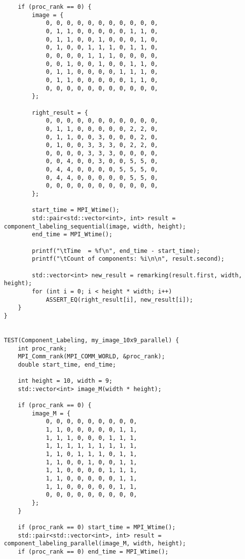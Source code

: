 \documentclass{report}
\begin{document}
\begin{lstlisting}
    if (proc_rank == 0) {
        image = {
            0, 0, 0, 0, 0, 0, 0, 0, 0, 0, 0,
            0, 1, 1, 0, 0, 0, 0, 0, 1, 1, 0,
            0, 1, 1, 0, 0, 1, 0, 0, 0, 1, 0,
            0, 1, 0, 0, 1, 1, 1, 0, 1, 1, 0,
            0, 0, 0, 0, 1, 1, 1, 0, 0, 0, 0,
            0, 0, 1, 0, 0, 1, 0, 0, 1, 1, 0,
            0, 1, 1, 0, 0, 0, 0, 1, 1, 1, 0,
            0, 1, 1, 0, 0, 0, 0, 0, 1, 1, 0,
            0, 0, 0, 0, 0, 0, 0, 0, 0, 0, 0,
        };

        right_result = {
            0, 0, 0, 0, 0, 0, 0, 0, 0, 0, 0,
            0, 1, 1, 0, 0, 0, 0, 0, 2, 2, 0,
            0, 1, 1, 0, 0, 3, 0, 0, 0, 2, 0,
            0, 1, 0, 0, 3, 3, 3, 0, 2, 2, 0,
            0, 0, 0, 0, 3, 3, 3, 0, 0, 0, 0,
            0, 0, 4, 0, 0, 3, 0, 0, 5, 5, 0,
            0, 4, 4, 0, 0, 0, 0, 5, 5, 5, 0,
            0, 4, 4, 0, 0, 0, 0, 0, 5, 5, 0,
            0, 0, 0, 0, 0, 0, 0, 0, 0, 0, 0,
        };

        start_time = MPI_Wtime();
        std::pair<std::vector<int>, int> result = component_labeling_sequential(image, width, height);
        end_time = MPI_Wtime();

        printf("\tTime  = %f\n", end_time - start_time);
        printf("\tCount of components: %i\n\n", result.second);

        std::vector<int> new_result = remarking(result.first, width, height);
        for (int i = 0; i < height * width; i++)
            ASSERT_EQ(right_result[i], new_result[i]);
    }
}


TEST(Component_Labeling, my_image_10x9_parallel) {
    int proc_rank;
    MPI_Comm_rank(MPI_COMM_WORLD, &proc_rank);
    double start_time, end_time;

    int height = 10, width = 9;
    std::vector<int> image_M(width * height);

    if (proc_rank == 0) {
        image_M = {
            0, 0, 0, 0, 0, 0, 0, 0, 0,
            1, 1, 0, 0, 0, 0, 0, 1, 1,
            1, 1, 1, 0, 0, 0, 1, 1, 1,
            1, 1, 1, 1, 1, 1, 1, 1, 1,
            1, 1, 0, 1, 1, 1, 0, 1, 1,
            1, 1, 0, 0, 1, 0, 0, 1, 1,
            1, 1, 0, 0, 0, 0, 1, 1, 1,
            1, 1, 0, 0, 0, 0, 0, 1, 1,
            1, 1, 0, 0, 0, 0, 0, 1, 1,
            0, 0, 0, 0, 0, 0, 0, 0, 0,
        };
    }

    if (proc_rank == 0) start_time = MPI_Wtime();
    std::pair<std::vector<int>, int> result = component_labeling_parallel(image_M, width, height);
    if (proc_rank == 0) end_time = MPI_Wtime();


\end{lstlisting}
\end{document}
